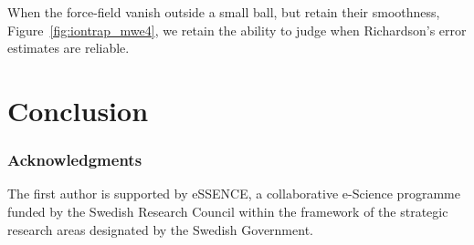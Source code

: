 \documentclass[runningheads]{llncs}
\begin{document}
When the force-field vanish outside a small ball, but retain their smoothness, Figure~\ref{fig:iontrap_mwe4}, we retain the ability to judge when Richardson's error estimates are reliable.


\section{Conclusion}



\subsubsection{Acknowledgments}

The first author is supported by eSSENCE, a collaborative e-Science programme funded by the Swedish Research Council within the framework of the strategic research areas designated by the Swedish Government.


%
%
%


 
\end{document}
